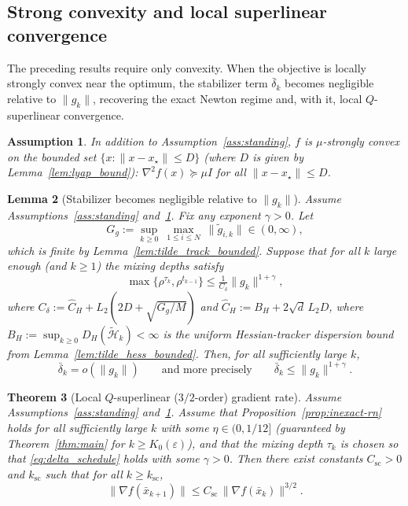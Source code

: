 \documentclass[11pt,a4paper]{article}
\newtheorem{theorem}{Theorem}[section]
\newtheorem{lemma}[theorem]{Lemma}
\newtheorem{assumption}[theorem]{Assumption}
\begin{document}
\subsection{Strong convexity and local superlinear convergence}\label{ssec:superlinear}
The preceding results require only convexity.
When the objective is locally strongly convex near the optimum,
the stabilizer term $\bar\delta_k$ becomes negligible relative to
$\|g_k\|$, recovering the exact Newton regime and, with it, local
$Q$-superlinear convergence.

\begin{assumption}\label{ass:strong}
In addition to Assumption~\ref{ass:standing}, $f$ is $\mu$-strongly convex on the bounded set
$\{x:\|x-x_\star\|\le D\}$ (where $D$ is given by Lemma~\ref{lem:lyap_bound}):
$\nabla^2 f(x)\succeq \mu I$ for all $\|x-x_\star\|\le D$.
\end{assumption}

\begin{lemma}[Stabilizer becomes negligible relative to $\|g_k\|$]\label{lem:delta_o_g}
Assume Assumptions~\ref{ass:standing} and~\ref{ass:strong}.
Fix any exponent $\gamma>0$.
Let
\[
G_g:=\sup_{k\ge 0}\ \max_{1\le i\le N}\ \|\tilde g_{i,k}\|\in(0,\infty),
\]
which is finite by Lemma~\ref{lem:tilde_track_bounded}.
Suppose that for all $k$ large enough (and $k\ge 1$) the mixing depths satisfy
\begin{equation}\label{eq:delta_schedule}
\max\{\rho^{\tau_k},\rho^{t_{k-1}}\}\le \tfrac{1}{C_\delta}\|g_k\|^{1+\gamma},
\end{equation}
where $C_\delta:=\hat C_H+L_2(2D+\sqrt{G_g/M})$ and $\hat C_H:=B_H+2\sqrt{d}\,L_2D$,
where $B_H:=\sup_{k\ge0}D_H(\tilde{\mathcal H}_k)<\infty$
is the uniform Hessian-tracker dispersion bound from Lemma~\ref{lem:tilde_hess_bounded}.
Then, for all sufficiently large $k$,
\[
\bar\delta_k = o(\|g_k\|)\qquad\text{and more precisely}\qquad \bar\delta_k\le \|g_k\|^{1+\gamma}.
\]
\end{lemma}

\begin{theorem}[Local $Q$-superlinear ($3/2$-order) gradient rate]\label{thm:superlinear}
Assume Assumptions~\ref{ass:standing} and~\ref{ass:strong}.
Assume that Proposition~\ref{prop:inexact-rn} holds for all sufficiently large $k$ with some $\eta\in(0,1/12]$
(guaranteed by Theorem~\ref{thm:main} for $k\ge K_0(\varepsilon)$),
and that the mixing depth $\tau_k$ is chosen so that \eqref{eq:delta_schedule} holds with some $\gamma>0$.
Then there exist constants $C_{\mathrm{sc}}>0$ and $k_{\mathrm{sc}}$ such that for all $k\ge k_{\mathrm{sc}}$,
\[
\|\nabla f(\bar x_{k+1})\|\le C_{\mathrm{sc}}\,\|\nabla f(\bar x_k)\|^{3/2}.
\]
\end{theorem}
\end{document}

